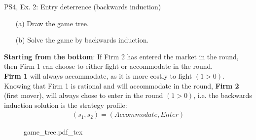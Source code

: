\begin{frame}{PS4, Ex. 2: Entry deterrence (backwards induction)}
  \begin{multicols}{2}
    \begin{itemize}
      \item[(a)] Draw the game tree.
      \item[(b)] Solve the game by backwards induction.
    \end{itemize}
    \textbf{Starting from the bottom}: If Firm 2 has entered the market in the  round, then Firm 1 can choose to either fight or accommodate in the  round.\\\medskip
    \textbf{Firm 1} will always accommodate, as it is more costly to fight $(1>0)$.\\\medskip
    Knowing that Firm 1 is rational and will accommodate in the  round, \textbf{Firm 2} (first mover), will always chose to enter in the  round $(1>0)$, i.e. the backwards induction solution is the strategy profile:
      \begin{align*}
        (s_1,s_2)=(Accommodate,Enter)
      \end{align*}
  \vfill\null \columnbreak
    \begin{figure}[!h]
      \begin{center}
      \def\svgwidth{1.0\columnwidth}
      {game_tree.pdf_tex}
      \end{center}
    \end{figure}
  \vfill\null
  \end{multicols}
\end{frame}
